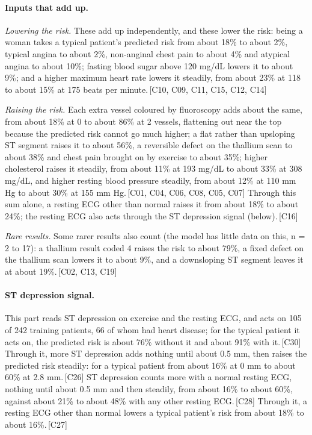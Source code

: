 \documentclass[a4paper,10pt]{article}
\newif\ifreviewmarks
\newcommand{\reviewrule}{\noindent{\color{BrickRed}\rule{\linewidth}{0.8pt}}}
\newenvironment{drafted}[1][]{%
  \ifreviewmarks\par\addvspace{\medskipamount}\reviewrule\par\nopagebreak
  \noindent{\color{BrickRed}\sffamily\footnotesize\textbf{Thesis Draft}\quad #1\hfill review}\par\nopagebreak\smallskip\fi}{%
  \ifreviewmarks\par\smallskip\noindent{\color{BrickRed}\sffamily\footnotesize end of thesis draft}\par\nopagebreak\reviewrule\par\medskip\fi}
\begin{document}
\begin{drafted}[plain-language layer: heart-s5-c3]
\paragraph{Inputs that add up.} \par\noindent\textit{Lowering the risk.}  These add up independently, and these lower the risk: being a woman takes a typical patient's predicted risk from about 18\% to about 2\%, typical angina to about 2\%, non-anginal chest pain to about 4\% and atypical angina to about 10\%; fasting blood sugar above 120 mg/dL lowers it to about 9\%; and a higher maximum heart rate lowers it steadily, from about 23\% at 118 to about 15\% at 175 beats per minute.\,{\scriptsize\textcolor{NavyBlue}{[C10, C09, C11, C15, C12, C14]}} \par\noindent\textit{Raising the risk.}  Each extra vessel coloured by fluoroscopy adds about the same, from about 18\% at 0 to about 86\% at 2 vessels, flattening out near the top because the predicted risk cannot go much higher; a flat rather than upsloping ST segment raises it to about 56\%, a reversible defect on the thallium scan to about 38\% and chest pain brought on by exercise to about 35\%; higher cholesterol raises it steadily, from about 11\% at 193 mg/dL to about 33\% at 308 mg/dL, and higher resting blood pressure steadily, from about 12\% at 110 mm Hg to about 30\% at 155 mm Hg.\,{\scriptsize\textcolor{NavyBlue}{[C01, C04, C06, C08, C05, C07]}} Through this sum alone, a resting ECG other than normal raises it from about 18\% to about 24\%; the resting ECG also acts through the ST depression signal (below).\,{\scriptsize\textcolor{NavyBlue}{[C16]}} \par\noindent\textit{Rare results.}  Some rarer results also count (the model has little data on this, n = 2 to 17): a thallium result coded 4 raises the risk to about 79\%, a fixed defect on the thallium scan lowers it to about 9\%, and a downsloping ST segment leaves it at about 19\%.\,{\scriptsize\textcolor{NavyBlue}{[C02, C13, C19]}}
\paragraph{ST depression signal.} This part reads ST depression on exercise and the resting ECG, and acts on 105 of 242 training patients, 66 of whom had heart disease; for the typical patient it acts on, the predicted risk is about 76\% without it and about 91\% with it.\,{\scriptsize\textcolor{NavyBlue}{[C30]}} Through it, more ST depression adds nothing until about 0.5 mm, then raises the predicted risk steadily: for a typical patient from about 16\% at 0 mm to about 60\% at 2.8 mm.\,{\scriptsize\textcolor{NavyBlue}{[C26]}} ST depression counts more with a normal resting ECG, nothing until about 0.5 mm and then steadily, from about 16\% to about 60\%, against about 21\% to about 48\% with any other resting ECG.\,{\scriptsize\textcolor{NavyBlue}{[C28]}} Through it, a resting ECG other than normal lowers a typical patient's risk from about 18\% to about 16\%.\,{\scriptsize\textcolor{NavyBlue}{[C27]}}

\end{drafted}
\end{document}
